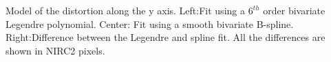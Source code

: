 Model of the distortion along the y axis.  Left:Fit using a $6^{th}$ order bivariate Legendre polynomial.  Center: Fit using a smooth bivariate B-spline. Right:Difference between the Legendre and spline fit.  All the differences are shown in NIRC2 pixels.  \label{dist_y}